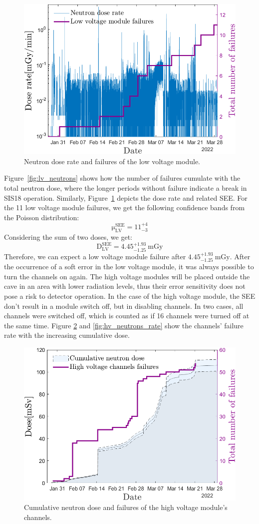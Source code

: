 \begin{figure}[!h]
    \centering
    \includegraphics[width=0.6\columnwidth]{Chapter4/images/neutrons_dose_rate.png}
    \caption{Neutron dose rate and failures of the low voltage module.}
    \label{fig:lv_neutrons_rate}
\end{figure}
Figure~\ref{fig:lv_neutrons} shows how the number of failures cumulate with the total neutron dose, where the longer periods without failure indicate a break in SIS18 operation. Similarly, Figure~\ref{fig:lv_neutrons_rate} depicts the dose rate and related \gls{SEE}.
For the 11 low voltage module failures, we get the following confidence bands from the Poisson distribution:
   \begin{equation}
  \mathrm{\mu}_{\mathrm{LV}}^{\mathrm{SEE}}=\mathrm{11}_{-3}^{+4}
\end{equation}
Considering the sum of two doses, we get:
\begin{equation}
    \mathrm{D}_{\mathrm{LV}}^{\mathrm{SEE}}=\mathrm{4.45}_{-1.25}^{+1.93}\mathrm{\ mGy}
\end{equation}
Therefore, we can expect a low voltage module failure after $\mathrm{4.45}_{-1.25}^{+1.93}\mathrm{\ mGy}.$ After the occurrence of a soft error in the low voltage module, it was always possible to turn the channels on again.
\newpage
The high voltage modules will be placed outside the cave in an area with lower radiation levels, thus their error sensitivity does not pose a risk to detector operation. In the case of the high voltage module, the \gls{SEE} don't result in a module switch off, but in disabling channels. In two cases, all channels were switched off, which is counted as if 16 channels were turned off at the same time. Figure \ref{fig:hv_neutrons} and \ref{fig:hv_neutrons_rate} show the channels' failure rate with the increasing cumulative dose. 
\begin{figure}[!h]
    \centering
    \includegraphics[width=0.6\columnwidth]{Chapter4/images/HV_failure_and_neutronrate.png}
    \caption{Cumulative neutron dose and failures of the high voltage module's channels.}
    \label{fig:hv_neutrons}
\end{figure}
